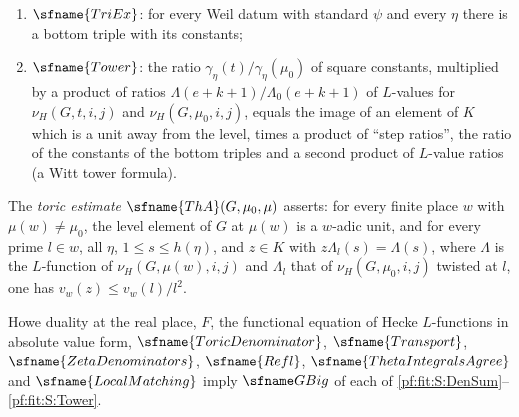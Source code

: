 \begin{enumerate}[label=(S\arabic*),leftmargin=*]
$1-e_0(\eta)\le s\le h(\eta)$, and those of $\mathrm{fam}(G,\mu_0,i,j,c)$ do not vanish at the integers $s\ge1$;
\item\label{pf:fit:S:TriEx} $\sfname{TriEx}$: for every Weil datum with standard $\psi$ and every $\eta$ there is a bottom
triple with its constants;
\item\label{pf:fit:S:Tower} $\sfname{Tower}$: the ratio $\gamma_\eta(t)/\gamma_\eta(\mu_0)$ of square constants, multiplied by a product of
ratios $\Lambda(e+k+1)/\Lambda_0(e+k+1)$ of $L$-values for $\nu_H(G,t,i,j)$ and $\nu_H(G,\mu_0,i,j)$, equals the image of an
element of $K$ which is a unit away from the level, times a product of ``step ratios'', the ratio of the constants of the
bottom triples and a second product of $L$-value ratios (a Witt tower formula).
\end{enumerate}
The \emph{toric estimate} $\sfname{ThA}(G,\mu_0,\mu)$ asserts: for every finite place $w$ with $\mu(w)\ne\mu_0$, the level
element of $G$ at $\mu(w)$ is a $w$-adic unit, and for every prime $l\in w$, all $\eta$, $1\le s\le h(\eta)$, and $z\in K$
with $z\Lambda_l(s)=\Lambda(s)$, where $\Lambda$ is the $L$-function of $\nu_H(G,\mu(w),i,j)$ and $\Lambda_l$ that of
$\nu_H(G,\mu_0,i,j)$ twisted at $l$, one has $v_w(z)\le v_w(l)/l^2$.

\begin{theorem}\label{pf:fit:sqtop}
Howe duality at the real place, $F$, the functional equation of Hecke $L$-functions in absolute value form,
$\sfname{ToricDenominator}$, $\sfname{Transport}$, $\sfname{ZetaDenominators}$, $\sfname{Refl}$, $\sfname{ThetaIntegralsAgree}$
and $\sfname{LocalMatching}$ imply $\fitGBig$ of each of \ref{pf:fit:S:DenSum}--\ref{pf:fit:S:Tower}.
\end{theorem}

